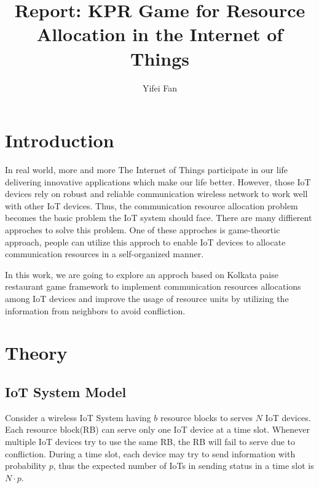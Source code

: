 \documentclass[runningheads]{llncs}
\begin{document}
%
\title{Report: KPR Game for
Resource Allocation in the Internet of Things}
%
%
\author{Yifei Fan}
%
%
%
\maketitle              %

\section{Introduction}
In real world, more and more The Internet of Things participate in our life 
delivering innovative applications which make our life better. However, those IoT devices 
rely on robust and reliable communication wireless network to work well with other IoT devices.
Thus, the communication resource allocation problem becomes the basic problem the IoT system should face.
There are many diffierent approches to solve this problem. One of these approches is game-theortic approach, 
people can utilize this approch to enable IoT devices to allocate communication resources in a self-organized manner.

In this work, we are going to explore an approch based on Kolkata paise restaurant game\cite{ref:KPR} framework to implement communication 
resources allocations among IoT devices and improve the usage of resource units by utilizing the information from neighbors to avoid confliction.

\section{Theory}

\subsection{IoT System Model}

Consider a wireless IoT System having $b$ resource blocks to serves $N$ IoT devices. 
Each resource block(RB) can serve only one IoT device at a time slot. Whenever multiple IoT devices
try to use the same RB, the RB will fail to serve due to confliction. 
During a time slot, each device may try to send information with probability $p$, 
thus the expected number of IoTs in sending status in a time slot is $N\cdot p$.
\end{document}
